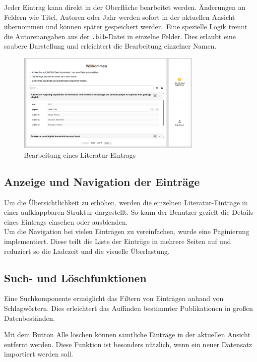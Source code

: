 \noindent Jeder Eintrag kann direkt in der Oberfläche bearbeitet werden. Änderungen an Feldern wie Titel,
Autoren oder Jahr werden sofort in der aktuellen Ansicht übernommen und können später gespeichert werden.
Eine spezielle Logik trennt die Autorenangaben aus der \texttt{.bib}-Datei in einzelne Felder.
Dies erlaubt eine saubere Darstellung und erleichtert die Bearbeitung einzelner Namen.

\begin{figure}[h]
    \centering
    \includegraphics[width=0.8\textwidth]{Graphics/frontend.png}
    \caption{Bearbeitung eines Literatur-Eintrags}
    \label{fig:bearbeiten}
\end{figure}

\subsection{Anzeige und Navigation der Einträge}
Um die Übersichtlichkeit zu erhöhen, werden die einzelnen Literatur-Einträge in einer aufklappbaren
Struktur dargestellt. So kann der Benutzer gezielt die Details eines Eintrags einsehen oder ausblenden.\\

\noindent Um die Navigation bei vielen Einträgen zu vereinfachen, wurde eine Paginierung implementiert.
Diese teilt die Liste der Einträge in mehrere Seiten auf und reduziert so die Ladezeit und die visuelle Überlastung.

\subsection{Such- und Löschfunktionen}
Eine Suchkomponente ermöglicht das Filtern von Einträgen anhand von Schlagwörtern.
Dies erleichtert das Auffinden bestimmter Publikationen in großen Datenbeständen.

\noindent Mit dem Button \glqq Alle löschen\grqq{} können sämtliche Einträge in der aktuellen Ansicht entfernt werden.
Diese Funktion ist besonders nützlich, wenn ein neuer Datensatz importiert werden soll.

